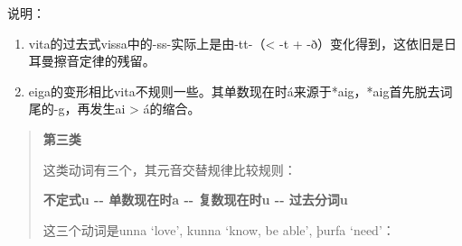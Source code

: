 说明：

\begin{enumerate}
\def\labelenumi{\arabic{enumi})}
\item
  vita的过去式vissa中的-ss-实际上是由-tt-（\textless{} -t +
  -ð）变化得到，这依旧是日耳曼擦音定律的残留。
\item
  eiga的变形相比vita不规则一些。其单数现在时á来源于*aig，*aig首先脱去词尾的-g，再发生ai
  \textgreater{} á的缩合。
\end{enumerate}

\begin{quote}
\textbf{第三类}

这类动词有三个，其元音交替规律比较规则：

\textbf{不定式u -\/- 单数现在时a -\/- 复数现在时u -\/- 过去分词u}

这三个动词是unna `love‌', kunna `know, be able‌', þurfa `need‌'：
\end{quote}

